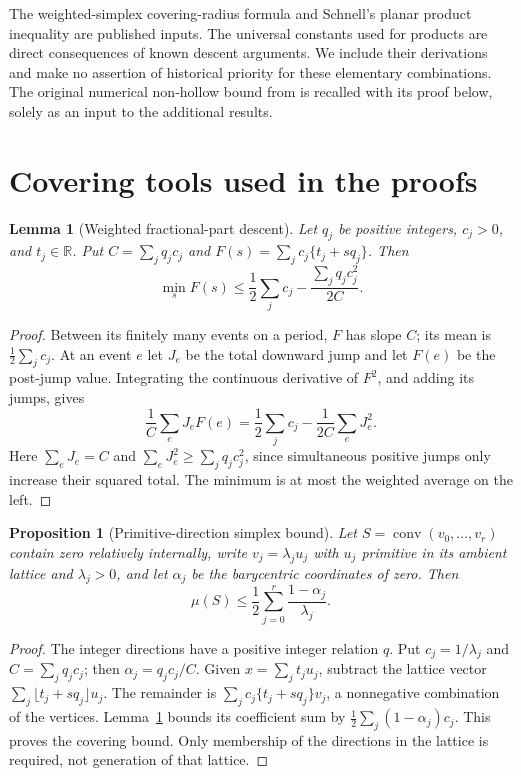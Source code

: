 \documentclass[11pt,a4paper]{article}
\newtheorem{lemma}[theorem]{Lemma}
\newtheorem{proposition}[theorem]{Proposition}
\theoremstyle{remark}\newtheorem{remark}[theorem]{Remark}
\DeclareMathOperator{\conv}{conv}
\newcommand{\R}{\mathbb R}\newcommand{\Z}{\mathbb Z}
\begin{document}
The weighted-simplex covering-radius formula and Schnell's planar
product inequality are published inputs. The universal constants used
for products are direct consequences of known descent arguments.
We include their derivations and make no assertion of historical
priority for these elementary combinations. The original numerical
non-hollow bound from \cite{VMRC200} is recalled with its proof below,
solely as an input to the additional results.

\section{Covering tools used in the proofs}

\begin{lemma}[Weighted fractional-part descent]\label{base:flow}
Let $q_j$ be positive integers, $c_j>0$, and $t_j\in\R$. Put
$C=\sum_jq_jc_j$ and $F(s)=\sum_jc_j\{t_j+sq_j\}$. Then
\[
 \min_s F(s)\le
 \frac12\sum_jc_j-\frac{\sum_jq_jc_j^2}{2C}.
\]
\end{lemma}
\begin{proof}
Between its finitely many events on a period, $F$ has slope $C$;
its mean is $\frac12\sum_jc_j$. At an event $e$ let $J_e$ be
the total downward jump and let $F(e)$ be the post-jump value.
Integrating the continuous derivative of $F^2$, and adding its
jumps, gives
\[
 \frac1C\sum_eJ_eF(e)
 =\frac12\sum_jc_j-\frac1{2C}\sum_eJ_e^2.
\]
Here $\sum_eJ_e=C$ and
$\sum_eJ_e^2\ge\sum_jq_jc_j^2$, since simultaneous positive
jumps only increase their squared total. The minimum is at most
the weighted average on the left.
\end{proof}

\begin{proposition}[Primitive-direction simplex bound]\label{base:simplex}
Let $S=\conv(v_0,\ldots,v_r)$ contain zero relatively internally,
write $v_j=\lambda_j u_j$ with $u_j$ primitive in its ambient lattice
and $\lambda_j>0$, and let $\alpha_j$ be the barycentric coordinates
of zero. Then
\[
 \mu(S)\le\frac12\sum_{j=0}^{r}\frac{1-\alpha_j}{\lambda_j}.
\]
\end{proposition}
\begin{proof}
The integer directions have a positive integer relation $q$.
Put $c_j=1/\lambda_j$ and $C=\sum_jq_jc_j$; then
$\alpha_j=q_jc_j/C$. Given $x=\sum_j t_j u_j$, subtract the lattice
vector $\sum_j\lfloor t_j+sq_j\rfloor u_j$. The remainder is
$\sum_jc_j\{t_j+sq_j\}v_j$, a nonnegative combination of the vertices.
Lemma~\ref{base:flow} bounds its coefficient sum by
$\frac12\sum_j(1-\alpha_j)c_j$. This proves the covering bound.
Only membership of the directions in the lattice is required, not
generation of that lattice.
\end{proof}
\end{document}
